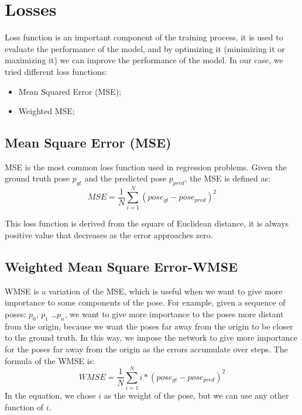 \section{Losses}\label{sec:losses}
Loss function is an important component of the training process, it is used to evaluate the performance of the model, and by optimizing it (minimizing it or maximizing it) we can improve the performance of the model.
In our case, we tried different loss functions:
\begin{itemize}
    \item Mean Squared Error (MSE);
    \item Weighted MSE;
\end{itemize}

\subsection{Mean Square Error (MSE)}\label{subsec:mean-square-error-(mse)}
MSE is the most common loss function used in regression problems.
Given the ground truth pose $p_{gt}$ and the predicted pose $p_{pred}$, the MSE is defined as:
\begin{equation}
    \label{eq:mean-square-error}
    MSE = \frac{1}{N} \sum_{i=1}^{N} (pose_{gt} - pose_{pred})^2
\end{equation}

This loss function is derived from the square of Euclidean distance, it is always positive value that decreases as the error approaches zero.

\subsection{Weighted Mean Square Error-WMSE}\label{subsec:weighted-mean-square-error-wmse}
WMSE is a variation of the MSE, which is useful when we want to give more importance to some components of the pose.
For example, given a sequence of poses: $p_0$, $p_1$ \dots $p_n$, we want to give more importance to the poses more distant from the origin, because we want the poses far away from the origin to be closer to the ground truth.
In this way, we impose the network to give more importance for the poses far away from the origin as the errors accumulate over steps.
The formula of the WMSE is:
\begin{equation}
    \label{eq:weighted-mean-square-error}
    WMSE = \frac{1}{N} \sum_{i=1}^{N} i * (pose_{gt} - pose_{pred})^2
\end{equation}
In the equation, we chose $i$ as the weight of the pose, but we can use any other function of $i$.
